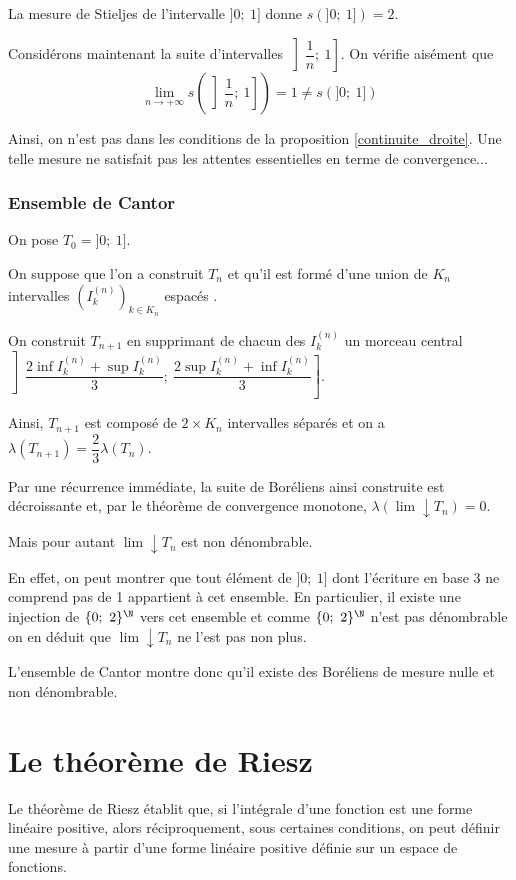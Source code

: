 La mesure de Stieljes de l'intervalle $]0;~1]$ donne $s(]0;~1])=2$.

Considérons maintenant la suite d'intervalles $\left]\dfrac{1}{n};~1\right]$. On vérifie aisément que 
\[
\lim \limits_{n \to +\infty} s\left(\left]\dfrac{1}{n};~1\right]\right) = 1 \neq s(]0;~1])
\]

Ainsi, on n'est pas dans les conditions de la proposition \ref{continuite_droite}. Une telle mesure ne satisfait pas les attentes essentielles en terme de convergence...

\subsubsection{Ensemble de Cantor}

On pose $T_0 = ]0;~1]$. 

On suppose que l'on a construit $T_n$ et qu'il est formé d'une union de $K_n$ intervalles $\left(I_k^{(n)}\right)_{k \in K_n}$ \og espacés \fg{}.

On construit $T_{n+1}$ en supprimant de chacun des $I_k^{(n)}$ un morceau central $\left]\dfrac{2 \inf I_k^{(n)} + \sup I_k^{(n)}}{3};~\dfrac{2 \sup I_k^{(n)} + \inf I_k^{(n)}}{3}\right]$. 

Ainsi, $T_{n+1}$ est composé de $2 \times K_n$ intervalles séparés et on a $\lambda(T_{n+1}) = \dfrac{2}{3} \lambda(T_n)$.

Par une récurrence immédiate, la suite de Boréliens ainsi construite est décroissante et, par le théorème de convergence monotone, $\lambda\left(\lim \downarrow T_n\right) = 0$.

Mais pour autant $\lim \downarrow T_n$ est non dénombrable.

En effet, on peut montrer que tout élément de $]0;~1]$ dont l'écriture en base 3 ne comprend pas de 1 appartient à cet ensemble. En particulier, il existe une injection de $\{0;~2\}^{\N}$ vers cet ensemble et comme $\{0;~2\}^{\N}$ n'est pas dénombrable on en déduit que $\lim \downarrow T_n$ ne l'est pas non plus.

L'ensemble de Cantor montre donc qu'il existe des Boréliens de mesure nulle et non dénombrable.

\section{Le théorème de Riesz}

Le théorème de Riesz établit que, si l'intégrale d'une fonction est une forme linéaire positive, alors réciproquement, sous certaines conditions, on peut définir une mesure à partir d'une forme linéaire positive définie sur un espace de fonctions.

